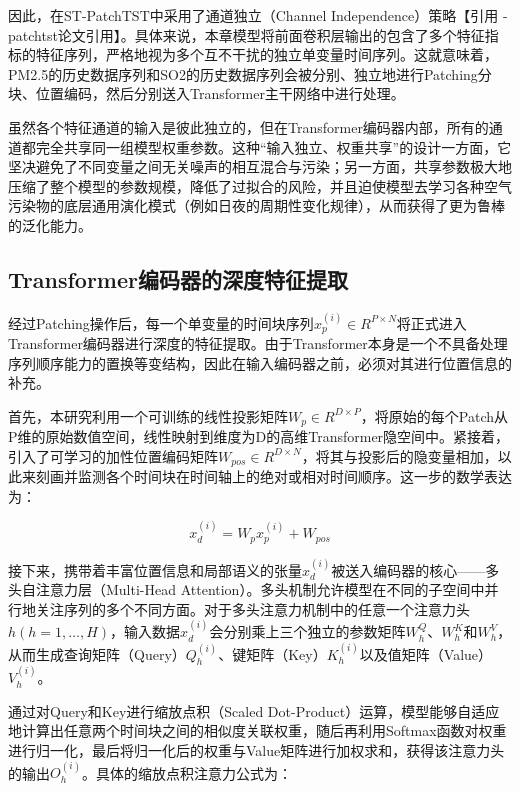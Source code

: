 因此，在ST-PatchTST中采用了通道独立（Channel Independence）策略\cite{[2]}【引用 - patchtst论文引用】。具体来说，本章模型将前面卷积层输出的包含了多个特征指标的特征序列，严格地视为多个互不干扰的独立单变量时间序列。这就意味着，PM2.5的历史数据序列和SO2的历史数据序列会被分别、独立地进行Patching分块、位置编码，然后分别送入Transformer主干网络中进行处理。

虽然各个特征通道的输入是彼此独立的，但在Transformer编码器内部，所有的通道都完全共享同一组模型权重参数。这种“输入独立、权重共享”的设计一方面，它坚决避免了不同变量之间无关噪声的相互混合与污染；另一方面，共享参数极大地压缩了整个模型的参数规模，降低了过拟合的风险，并且迫使模型去学习各种空气污染物的底层通用演化模式（例如日夜的周期性变化规律），从而获得了更为鲁棒的泛化能力。


\subsection{Transformer编码器的深度特征提取}


经过Patching操作后，每一个单变量的时间块序列$x_p^{(i)}∈R^{P \times N}$将正式进入Transformer编码器进行深度的特征提取。由于Transformer本身是一个不具备处理序列顺序能力的置换等变结构，因此在输入编码器之前，必须对其进行位置信息的补充。

首先，本研究利用一个可训练的线性投影矩阵$W_p \in R^{D \times P}$，将原始的每个Patch从P维的原始数值空间，线性映射到维度为D的高维Transformer隐空间中。紧接着，引入了可学习的加性位置编码矩阵$W_{pos}∈R^{D \times N}$，将其与投影后的隐变量相加，以此来刻画并监测各个时间块在时间轴上的绝对或相对时间顺序。这一步的数学表达为：

\begin{equation}\label{eq:pos_encoding}
x_d^{(i)} = W_p x_p^{(i)} + W_{pos}
\end{equation}

接下来，携带着丰富位置信息和局部语义的张量$x_d^{(i)}$被送入编码器的核心——多头自注意力层（Multi-Head Attention）。多头机制允许模型在不同的子空间中并行地关注序列的多个不同方面。对于多头注意力机制中的任意一个注意力头$h(h=1,\dots,H)$，输入数据$x_d^{(i)}$会分别乘上三个独立的参数矩阵$W_h^Q$、$W_h^K$和$W_h^V$，从而生成查询矩阵（Query）$Q_h^{(i)}$、键矩阵（Key）$K_h^{(i)}$以及值矩阵（Value）$V_h^{(i)}$。

通过对Query和Key进行缩放点积（Scaled Dot-Product）运算，模型能够自适应地计算出任意两个时间块之间的相似度关联权重，随后再利用Softmax函数对权重进行归一化，最后将归一化后的权重与Value矩阵进行加权求和，获得该注意力头的输出$O_h^{(i)}$。具体的缩放点积注意力公式为：

